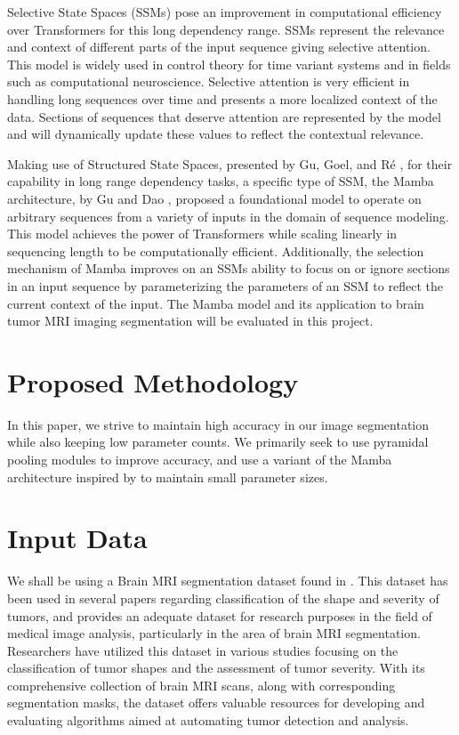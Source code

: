 \documentclass[conference]{IEEEtran}
\begin{document}
Selective State Spaces (SSMs) pose an improvement in computational efficiency over Transformers for this long dependency range. SSMs represent the relevance and context of different parts of the input sequence giving selective attention. This model is widely used in control theory for time variant systems and in fields such as computational neuroscience. Selective attention is very efficient in handling long sequences over time and presents a more localized context of the data. Sections of sequences that deserve attention are represented by the model and will dynamically update these values to reflect the contextual relevance.

Making use of Structured State Spaces, presented by Gu, Goel, and Ré \cite{gu2022efficiently}, for their capability in long range dependency tasks, a specific type of SSM, the Mamba architecture, by Gu and Dao \cite{gu2023mamba}, proposed a foundational model to operate on arbitrary sequences from a variety of inputs in the domain of sequence modeling. This model achieves the power of Transformers while scaling linearly in sequencing length to be computationally efficient. Additionally, the selection mechanism of Mamba improves on an SSMs ability to focus on or ignore sections in an input sequence by parameterizing the parameters of an SSM to reflect the current context of the input. The Mamba model and its application to brain tumor MRI imaging segmentation will be evaluated in this project.

\section{Proposed Methodology}
In this paper, we strive to maintain high accuracy in our image segmentation while also keeping low parameter counts. We primarily seek to use pyramidal pooling modules \cite{zhao2017pyramid} to improve accuracy, and use a variant of the Mamba \cite{gu2023mamba} architecture inspired by \cite{wu2024ultralight} to maintain small parameter sizes.

\section{Input Data}\label{sec2}
We shall be using a Brain MRI segmentation dataset found in \cite{dataset}. This dataset has been used in several papers regarding classification of the shape and severity of tumors, and provides an adequate dataset for research purposes in the field of medical image analysis, particularly in the area of brain MRI segmentation. Researchers have utilized this dataset in various studies focusing on the classification of tumor shapes and the assessment of tumor severity. With its comprehensive collection of brain MRI scans, along with corresponding segmentation masks, the dataset offers valuable resources for developing and evaluating algorithms aimed at automating tumor detection and analysis.
\end{document}
